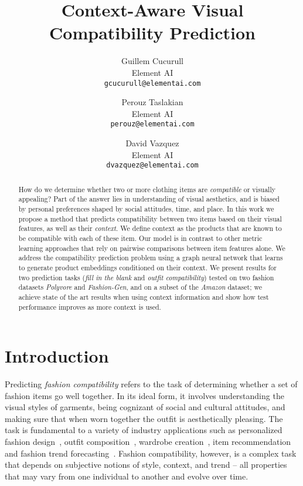 \documentclass[10pt,twocolumn,letterpaper]{article}
\begin{document}
\title{Context-Aware Visual Compatibility Prediction}


\author{Guillem Cucurull\\
Element AI\\
{\tt\small gcucurull@elementai.com}
\and
Perouz Taslakian\\
Element AI\\
{\tt\small perouz@elementai.com}
\and
David Vazquez\\
Element AI\\
{\tt\small dvazquez@elementai.com}
}

\maketitle




\begin{abstract}
How do we determine whether two or more clothing items are \emph{compatible} or visually appealing?
Part of the answer lies in understanding of visual aesthetics, and is biased by personal preferences shaped by social attitudes, time, and place. In this work we propose a method that predicts compatibility between two items based on their visual features, as well as 
their \emph{context}. We define context as the products that are known to be compatible with each of these item. Our model is in contrast to other metric learning approaches that rely on pairwise comparisons between item features alone. We address the compatibility prediction problem using a graph neural network that learns to generate product embeddings conditioned on their context. We present results for two prediction tasks (\emph{fill in the blank} and \emph{outfit compatibility}) tested on two fashion datasets \emph{Polyvore} and \emph{Fashion-Gen}, and on a subset of the \emph{Amazon} dataset; we achieve state of the art results when using context information and show how test performance improves as more context is used.

\end{abstract}






\section{Introduction}
\label{sec:intro}

Predicting \emph{fashion compatibility} refers to the task of determining whether a set of fashion items go well together. In its ideal form, it involves understanding the visual styles of garments, being cognizant of social and cultural attitudes, and making sure that when worn together the outfit is aesthetically pleasing. The task is fundamental to a variety of industry applications such as personalized fashion design~\cite{kang2017visually}, outfit composition~\cite{feng2018interpretable}, wardrobe creation~\cite{hsiao2018creating}, item recommendation~\cite{shih2018compatibility} and fashion trend forecasting~\cite{al2017fashion}. Fashion compatibility, however, is a complex task that depends on subjective notions of style, context, and trend -- all properties that may vary from one individual to another and evolve over time.
\end{document}
